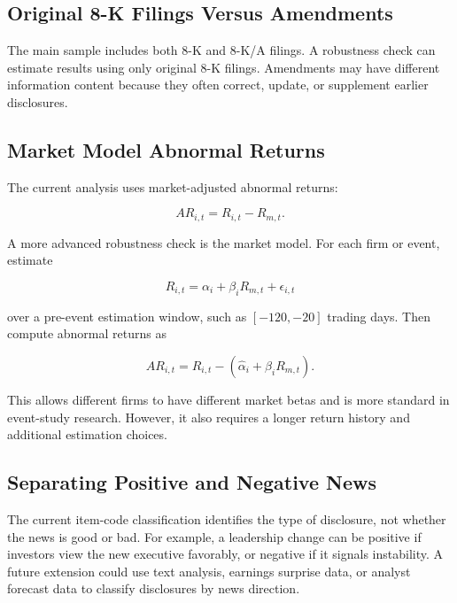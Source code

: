 \documentclass[12pt]{article}
\begin{document}
	\subsection{Original 8-K Filings Versus Amendments}
	
	The main sample includes both 8-K and 8-K/A filings. A robustness check can estimate results using only original 8-K filings. Amendments may have different information content because they often correct, update, or supplement earlier disclosures.
	
	\subsection{Market Model Abnormal Returns}
	
	The current analysis uses market-adjusted abnormal returns:
	
	\begin{equation}
		AR_{i,t} = R_{i,t} - R_{m,t}.
	\end{equation}
	
	A more advanced robustness check is the market model. For each firm or event, estimate
	
	\begin{equation}
		R_{i,t} = \alpha_i + \beta_i R_{m,t} + \epsilon_{i,t}
	\end{equation}
	
	over a pre-event estimation window, such as $[-120,-20]$ trading days. Then compute abnormal returns as
	
	\begin{equation}
		AR_{i,t} = R_{i,t} - \left(\hat{\alpha}_i + \hat{\beta}_i R_{m,t}\right).
	\end{equation}
	
	This allows different firms to have different market betas and is more standard in event-study research. However, it also requires a longer return history and additional estimation choices.
	
	\subsection{Separating Positive and Negative News}
	
	The current item-code classification identifies the type of disclosure, not whether the news is good or bad. For example, a leadership change can be positive if investors view the new executive favorably, or negative if it signals instability. A future extension could use text analysis, earnings surprise data, or analyst forecast data to classify disclosures by news direction.
	
\end{document}

